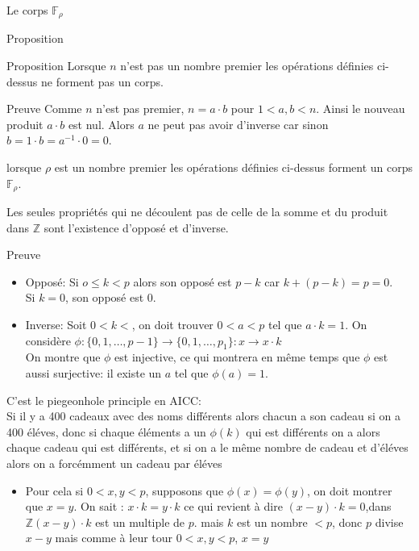 \begin{parag}{Le corps $\mathbb{F_\rho}$}
\begin{subparag}{Proposition}
    \begin{theoreme}{Proposition}
        Lorsque $n$ n'est pas un nombre premier les opérations définies ci-dessus ne forment pas un corps.
    \end{theoreme}
\end{subparag}
\begin{subparag}{Preuve}
    Comme $n$ n'est pas premier, $n = a \cdot b$ pour $1 < a, b < n$.
    Ainsi le nouveau produit $a \cdot b$ est nul. Alors $a$ ne peut pas avoir d'inverse car sinon $b = 1 \cdot b = a^{-1} \cdot 0 = 0$.
\end{subparag}   
\begin{theoreme}
    lorsque $\rho$ est un nombre premier les opérations définies ci-dessus forment un corps $\mathbb{F_\rho}$.
\end{theoreme}
Les seules propriétés qui ne découlent pas de celle de la somme et du produit dans $\mathbb{Z}$ sont l'existence d'opposé et d'inverse.
\begin{subparag}{Preuve}
    \begin{itemize}
        \item Opposé: Si $o \leq k < p$ alors son opposé est $p-k$ car $k + (p-k) = p = 0$.\\
        Si $k = 0$, son opposé est $0$.
        \item Inverse: Soit $0 < k <$, on doit trouver $0 < a  < p$ tel que $a \cdot k = 1$. On considère $\phi : \{0, 1, \dots, p-1\} \to \{0, 1, \dots, p_1\} : x \to x \cdot k $\\
        On montre que $\phi$ est injective, ce qui montrera en même temps que $\phi$ est aussi surjective: il existe un $a$ tel que $\phi(a) = 1$.
    \end{itemize}
    \begin{framedremark}
        C'est le piegeonhole principle en AICC:
        \\
        Si il y a 400 cadeaux avec des noms différents alors chacun a son cadeau si on a 400 éléves, donc si chaque éléments a un $\phi(k)$ qui est différents on a alors chaque cadeau qui est différents, et si on a le même nombre de cadeau et d'éléves alors on a forcémment un cadeau par éléves
    \end{framedremark}
    \begin{itemize}
        \item Pour cela si $0 < x, y<p$, supposons que $\phi(x) = \phi(y)$, on doit montrer que $x = y$. On sait : $x \cdot k = y \cdot k$ ce qui revient à dire $(x-y)\cdot k = 0$,dans $\mathbb{Z} (x-y)\cdot k$ est un multiple de $p$. mais $k$ est un nombre $< p$, donc $p$ divise $x - y$ mais comme à leur tour $0 < x, y < p$, $x = y$

\end{itemize}
\end{subparag}
\end{parag}
